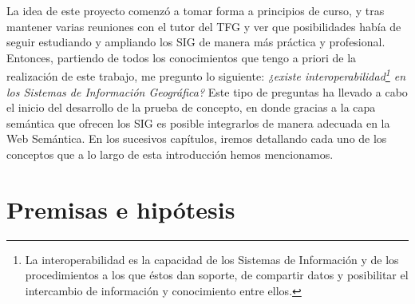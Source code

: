La idea de este proyecto comenzó a tomar forma a principios de curso, y tras mantener varias reuniones con el tutor del TFG y ver que posibilidades había de seguir estudiando y ampliando los SIG de manera más práctica y profesional. Entonces, partiendo de todos los conocimientos que tengo a priori de la realización de este trabajo, me pregunto lo siguiente: \textit{¿existe interoperabilidad\footnote{La interoperabilidad es la capacidad de los Sistemas de Información y de los procedimientos a los que éstos dan soporte, de compartir datos y posibilitar el intercambio de información y conocimiento entre ellos.} en los Sistemas de Información Geográfica?} Este tipo de preguntas ha llevado a cabo el inicio del desarrollo de la prueba de concepto, en donde gracias a la capa semántica que ofrecen los SIG es posible integrarlos de manera adecuada en la Web Semántica. En los sucesivos capítulos, iremos detallando cada uno de los conceptos que a lo largo de esta introducción hemos mencionamos.





\section{Premisas e hipótesis}


